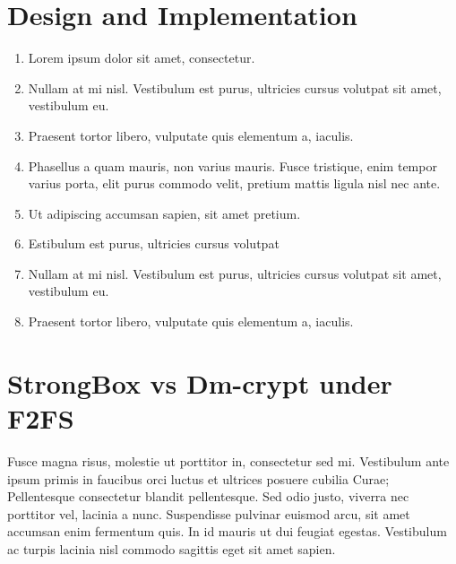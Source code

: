 \documentclass[a0,portrait]{a0poster}
\begin{document}
\begin{multicols}{2}
\section*{Design and Implementation}

\begin{enumerate}
\item Lorem ipsum dolor sit amet, consectetur.
\item Nullam at mi nisl. Vestibulum est purus, ultricies cursus volutpat sit amet, vestibulum eu.
\item Praesent tortor libero, vulputate quis elementum a, iaculis.
\item Phasellus a quam mauris, non varius mauris. Fusce tristique, enim tempor varius porta, elit purus commodo velit, pretium mattis ligula nisl nec ante.
\item Ut adipiscing accumsan sapien, sit amet pretium.
\item Estibulum est purus, ultricies cursus volutpat
\item Nullam at mi nisl. Vestibulum est purus, ultricies cursus volutpat sit amet, vestibulum eu.
\item Praesent tortor libero, vulputate quis elementum a, iaculis.
\end{enumerate}


\section*{StrongBox vs Dm-crypt under F2FS}

Fusce magna risus, molestie ut porttitor in, consectetur sed mi. Vestibulum ante ipsum primis in faucibus orci luctus et ultrices posuere cubilia Curae; Pellentesque consectetur blandit pellentesque. Sed odio justo, viverra nec porttitor vel, lacinia a nunc. Suspendisse pulvinar euismod arcu, sit amet accumsan enim fermentum quis. In id mauris ut dui feugiat egestas. Vestibulum ac turpis lacinia nisl commodo sagittis eget sit amet sapien.


\color{SaddleBrown} %


\end{multicols}
\end{document}

